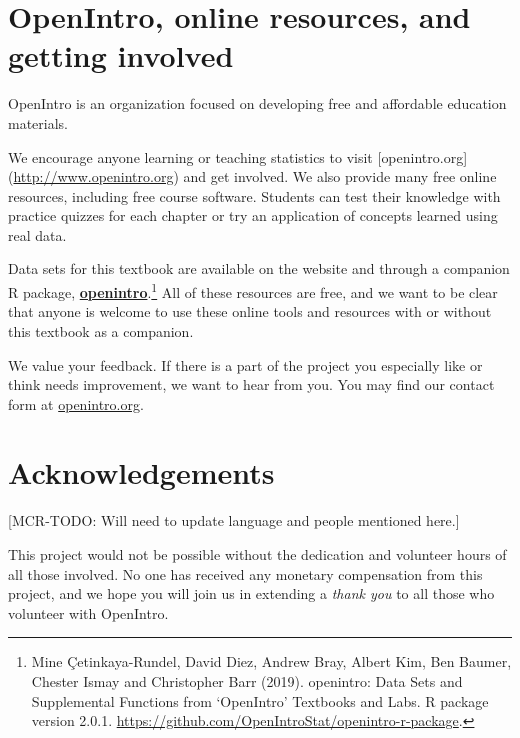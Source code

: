 \documentclass[]{book}
\let\rmarkdownfootnote\footnote%
\def\footnote{\protect\rmarkdownfootnote}
\begin{document}
\hypertarget{openintro-online-resources-and-getting-involved}{%
\section*{OpenIntro, online resources, and getting involved}\label{openintro-online-resources-and-getting-involved}}

OpenIntro is an organization focused on developing free and affordable education materials.

We encourage anyone learning or teaching statistics to visit {[}openintro.org{]} (\url{http://www.openintro.org}) and get involved. We also provide many free online resources, including free course software. Students can test their knowledge with practice quizzes for each chapter or try an application of concepts learned using real data.

Data sets for this textbook are available on the website and through a companion R package, \href{http://openintrostat.github.io/openintro-r-package/}{\textbf{openintro}}.\footnote{Mine Çetinkaya-Rundel, David Diez, Andrew Bray, Albert Kim, Ben Baumer, Chester Ismay and Christopher Barr (2019). openintro: Data Sets and Supplemental Functions from `OpenIntro' Textbooks and Labs. R package version 2.0.1. \url{https://github.com/OpenIntroStat/openintro-r-package}.} All of these resources are free, and we want to be clear that anyone is welcome to use these online tools and resources with or without this textbook as a companion.

We value your feedback. If there is a part of the project you especially like or think needs improvement, we want to hear from you. You may find our contact form at \href{https://www.openintro.org/form/?f=contact}{openintro.org}.

\hypertarget{acknowledgements}{%
\section*{Acknowledgements}\label{acknowledgements}}

{[}MCR-TODO: Will need to update language and people mentioned here.{]}

This project would not be possible without the dedication and volunteer hours of all those involved. No one has received any monetary compensation from this project, and we hope you will join us in extending a \emph{thank you} to all those who volunteer with OpenIntro.
\end{document}
